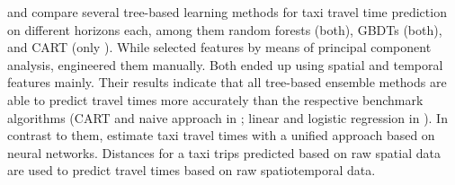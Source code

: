 \cite{Huang2018_GBDT} and \cite{huang2020travel_GBDT} compare several tree-based learning methods for taxi travel time prediction on different horizons each, among them random forests (both), GBDTs (both), and CART (only \cite{huang2020travel_GBDT}). While \cite{Huang2018_GBDT} selected features by means of principal component analysis, \cite{huang2020travel_GBDT} engineered them manually. Both ended up using spatial and temporal features mainly. Their results indicate that all tree-based ensemble methods are able to predict travel times more accurately than the respective benchmark algorithms (CART and naive approach in \cite{huang2020travel_GBDT}; linear and logistic regression in \cite{Huang2018_GBDT}).
In contrast to them, \cite{jindal2017unified} estimate taxi travel times with a unified approach based on neural networks. Distances for a taxi trips predicted based on raw spatial data are used to predict travel times based on raw spatiotemporal data.
